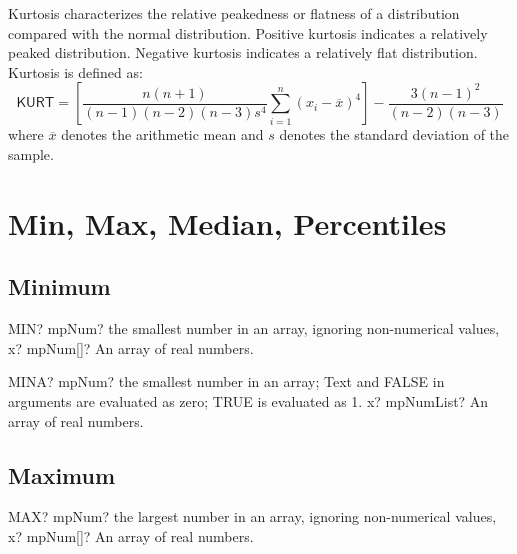 \vspace{0.3cm}
Kurtosis characterizes the relative peakedness or flatness of a distribution compared with the normal distribution. Positive kurtosis indicates a relatively peaked distribution. Negative kurtosis indicates a relatively flat distribution. Kurtosis is defined as:
\begin{equation}
	\textsf{KURT} = \left[\frac{n(n+1)}{(n-1)(n-2)(n-3) s^4}\sum_{i=1}^n (x_i-\overline{x})^4\right]  - \frac{3(n-1)^2}{(n-2)(n-3)}
\end{equation}
where $\overline{x}$ denotes the arithmetic mean and $s$ denotes the standard deviation of the sample.










\newpage
\section{Min, Max, Median, Percentiles}

\subsection{Minimum}

\begin{mpFunctionsExtract}
	\mpWorksheetFunctionOneNotImplemented
	{MIN? mpNum? the smallest number in an array, ignoring non-numerical values,}
	{x? mpNum[]? An array of real numbers.}
\end{mpFunctionsExtract}


\vspace{0.6cm}
\begin{mpFunctionsExtract}
	\mpWorksheetFunctionOneNotImplemented
	{MINA? mpNum? the smallest number in an array; Text and FALSE in arguments are evaluated as zero; TRUE is evaluated as 1.}
	{x? mpNumList? An array of real numbers.}
\end{mpFunctionsExtract}






\subsection{Maximum}

\begin{mpFunctionsExtract}
	\mpWorksheetFunctionOneNotImplemented
	{MAX? mpNum? the largest number in an array, ignoring non-numerical values,}
	{x? mpNum[]? An array of real numbers.}
\end{mpFunctionsExtract}


